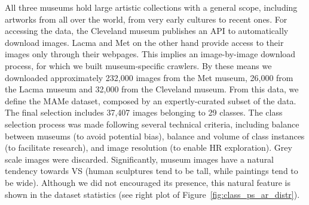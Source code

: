 \documentclass{article}
\begin{document}
All three museums hold large artistic collections with a general scope, including artworks from all over the world, from very early cultures to recent ones. For accessing the data, the Cleveland museum publishes an API to automatically download images. Lacma and Met on the other hand provide access to their images only through their webpages. This implies an image-by-image download process, for which we built museum-specific crawlers. By these means we downloaded approximately 232,000 images from the Met museum, 26,000 from the Lacma museum and 32,000 from the Cleveland museum. From this data, we define the MAMe dataset, composed by an expertly-curated subset of the data. The final selection includes 37,407 images belonging to 29 classes. The class selection process was made following several technical criteria, including balance between museums (to avoid potential bias), balance and volume of class instances (to facilitate research), and image resolution (to enable HR exploration). Grey scale images were discarded. Significantly, museum images have a natural tendency towards VS (\eg human sculptures tend to be tall, while paintings tend to be wide). Although we did not encouraged its presence, this natural feature is shown in the dataset statistics (see right plot of Figure~\ref{fig:class_ps_ar_distr}).
\end{document}
